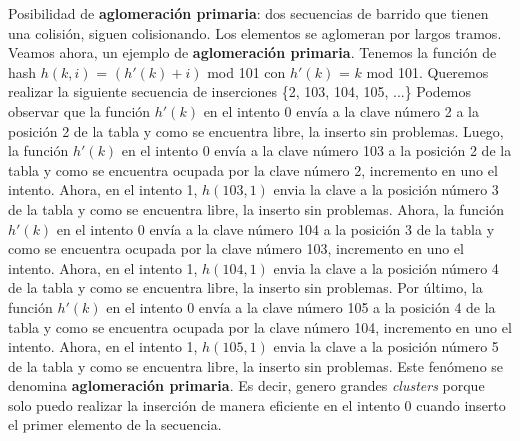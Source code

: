 \documentclass[10pt,a4paper]{article}
\begin{document}
Posibilidad de \textbf{aglomeración primaria}: dos secuencias de barrido que tienen una colisión, siguen colisionando.
\newline
\newline
Los elementos se aglomeran por largos tramos.
\newline
\newline
Veamos ahora, un ejemplo de \textbf{aglomeración primaria}.
\newline
\newline
Tenemos la función de hash $h(k,i)$ = $(h'(k) + i)$ mod 101 con $h'(k)$ = $k$ mod 101.
\newline
\newline
Queremos realizar la siguiente secuencia de inserciones \{2, 103, 104, 105, ...\}
\newline
\newline
Podemos observar que la función $h'(k)$ en el intento 0 envía a la clave número 2 a la posición 2 de la tabla y como se encuentra libre, la inserto sin problemas.
\newline
\newline
Luego, la función $h'(k)$ en el intento 0 envía a la clave número 103 a la posición 2 de la tabla y como se encuentra ocupada por la clave número 2, incremento en uno el intento. Ahora, en el intento 1, $h(103, 1)$ envia la clave a la posición número 3 de la tabla y como se encuentra libre, la inserto sin problemas.  
\newline
\newline
Ahora, la función $h'(k)$ en el intento 0 envía a la clave número 104 a la posición 3 de la tabla y como se encuentra ocupada por la clave número 103, incremento en uno el intento. Ahora, en el intento 1, $h(104, 1)$ envia la clave a la posición número 4 de la tabla y como se encuentra libre, la inserto sin problemas.  
\newline
\newline
Por último, la función $h'(k)$ en el intento 0 envía a la clave número 105 a la posición 4 de la tabla y como se encuentra ocupada por la clave número 104, incremento en uno el intento. Ahora, en el intento 1, $h(105, 1)$ envia la clave a la posición número 5 de la tabla y como se encuentra libre, la inserto sin problemas.  
\newline
\newline
Este fenómeno se denomina \textbf{aglomeración primaria}. Es decir, genero grandes \textit{clusters} porque solo puedo realizar la inserción de manera eficiente en el intento 0 cuando inserto el primer elemento de la secuencia. 
\end{document}
